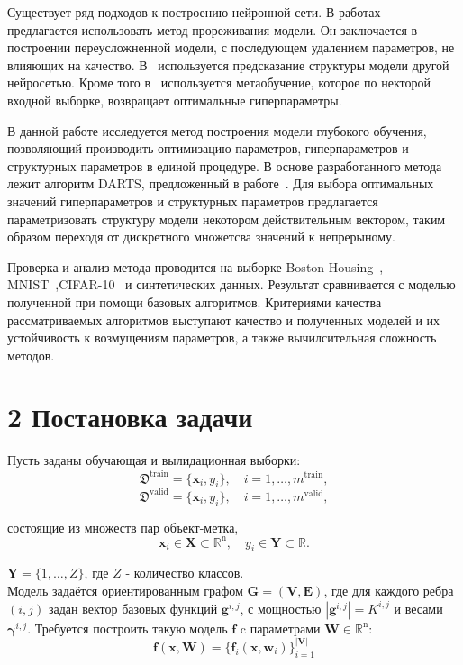 \documentclass[12pt,twoside]{article}
\begin{document}
Существует ряд подходов к построению нейронной сети. В работах~\cite{BrainDamage,PV} предлагается использовать метод прореживания модели. Он заключается в построении переусложненной модели, с последующем удалением параметров, не влияющих на качество. В~\cite{EASNT} используется предсказание структуры модели другой нейросетью. Кроме того в~\cite{GO} используется метаобучение, которое по некторой входной выборке, возвращает оптимальные гиперпараметры.

В данной работе исследуется метод построения модели глубокого обучения, позволяющий производить оптимизацию параметров, гиперпараметров и структурных параметров в единой процедуре. В основе разработанного метода лежит алгоритм DARTS, предложенный в работе~\cite{DARTS}. Для выбора  оптимальных значений гиперпараметров и структурных параметров предлагается  параметризовать структуру
модели некотором действительным вектором, таким образом переходя от дискретного множетсва значений к непрерыному.

Проверка и анализ метода проводится на выборке Boston Housing~\cite{Boston}, MNIST~\cite{MNIST},CIFAR-10~\cite{CIFAR-10} и синтетических данных. Результат сравнивается с моделью полученной при помощи базовых алгоритмов. Критериями качества рассматриваемых алгоритмов выступают качество и полученных моделей и их устойчивость к возмущениям параметров, а также вычилсительная сложность методов.

\section{2 Постановка задачи}
Пусть заданы обучающая и вылидационная выборки:
\[
\mathfrak{D}^{\text{train}} = \{\mathbf{x}_i, y_i\}, \quad i=1,\dots,m^{\text{train}},
\]
\[
\mathfrak{D}^{\text{valid}} = \{\mathbf{x}_i, y_i\}, \quad i=1,\dots,m^{\text{valid}},
\]

состоящие из множеств пар объект-метка,
\[
\mathbf{x}_i\in\mathbf{X}\subset\mathbb{R}^{\text{n}},\quad y_i\in\mathbf{Y}\subset\mathbb{R}.
\] 

$\mathbf{Y}= \{1,\dots,Z\}$, где $Z$ - количество классов.
\\

Модель задаётся ориентированным графом $\mathbf{G=(V,E)}$, где для каждого ребра $(i,j)$ задан вектор базовых функций $\mathbf{g}^{i,j}$, с мощностью $|\mathbf{g}^{i,j}| = K^{i,j}$ и весами $\boldsymbol{\gamma}^{i,j}$. Требуется построить такую модель $\mathbf{f}$ c параметрами $\mathbf{W}\in\mathbb{R}^\text{n}$:
\[
\mathbf{f}(\mathbf{x}, \mathbf{W})= \{ \mathbf{f}_i(\mathbf{x}, \mathbf{w}_i)\}_{i=1}^\mathbf{|V|}
\]
\end{document}
